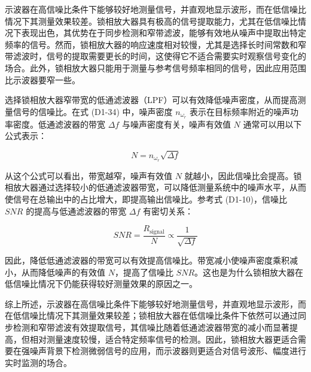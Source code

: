 示波器在高信噪比条件下能够较好地测量信号，并直观地显示波形，而在低信噪比情况下其测量效果较差。锁相放大器具有极高的信号提取能力，尤其在低信噪比情况下表现出色，其优势在于同步检测和窄带滤波，能够有效地从噪声中提取出特定频率的信号。然而，锁相放大器的响应速度相对较慢，尤其是选择长时间常数和窄带滤波时，信号的提取需要更长的时间，这使得它不适合需要实时观察信号变化的场合。此外，锁相放大器只能用于测量与参考信号频率相同的信号，因此应用范围比示波器要窄一些。

选择锁相放大器窄带宽的低通滤波器（LPF）可以有效降低噪声密度，从而提高测量信号的信噪比。在式 (D1-34) 中，噪声密度 \( n_{\omega_r} \) 表示在目标频率附近的噪声功率密度。低通滤波器的带宽 \( \Delta f \) 与噪声密度有关，噪声有效值 \( N \) 通常可以用以下公式表示：

\[
N = n_{\omega_r} \sqrt{\Delta f}
\]

从这个公式可以看出，带宽越窄，噪声有效值 \( N \) 就越小，因此信噪比会提高。锁相放大器通过选择较小的低通滤波器带宽，可以降低测量系统中的噪声水平，从而使信号在总输出中的占比增大，即提高输出信噪比。参考式 (D1-10)，信噪比 \( SNR \) 的提高与低通滤波器的带宽 \( \Delta f \) 有密切关系：

\[
SNR = \frac{R_{\text{signal}}}{N} \propto \frac{1}{\sqrt{\Delta f}}
\]

因此，降低低通滤波器的带宽可以有效提高信噪比。带宽减小使噪声密度乘积减小，从而降低噪声的有效值 \( N \)，提高了信噪比 \( SNR \)。这也是为什么锁相放大器在低信噪比情况下仍能获得较好测量效果的原因之一。

综上所述，示波器在高信噪比条件下能够较好地测量信号，并直观地显示波形，而在低信噪比情况下其测量效果较差；锁相放大器在低信噪比条件下依然可以通过同步检测和窄带滤波有效提取信号，其信噪比随着低通滤波器带宽的减小而显著提高，但相对测量速度较慢，适合特定频率信号的检测。因此，锁相放大器更适合需要在强噪声背景下检测微弱信号的应用，而示波器则更适合对信号波形、幅度进行实时监测的场合。
